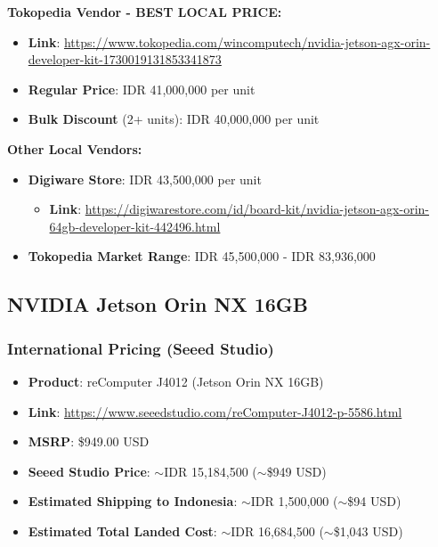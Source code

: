 \documentclass[12pt,a4paper]{article}
\begin{document}
\textbf{Tokopedia Vendor - BEST LOCAL PRICE:}
\begin{itemize}
    \item \textbf{Link}: \url{https://www.tokopedia.com/wincomputech/nvidia-jetson-agx-orin-developer-kit-1730019131853341873}
    \item \textbf{Regular Price}: IDR 41,000,000 per unit
    \item \textbf{Bulk Discount} (2+ units): IDR 40,000,000 per unit
\end{itemize}

\textbf{Other Local Vendors:}
\begin{itemize}
    \item \textbf{Digiware Store}: IDR 43,500,000 per unit
    \begin{itemize}
        \item \textbf{Link}: \url{https://digiwarestore.com/id/board-kit/nvidia-jetson-agx-orin-64gb-developer-kit-442496.html}
    \end{itemize}
    \item \textbf{Tokopedia Market Range}: IDR 45,500,000 - IDR 83,936,000
\end{itemize}

\subsection{NVIDIA Jetson Orin NX 16GB}

\subsubsection*{International Pricing (Seeed Studio)}
\begin{itemize}
    \item \textbf{Product}: reComputer J4012 (Jetson Orin NX 16GB)
    \item \textbf{Link}: \url{https://www.seeedstudio.com/reComputer-J4012-p-5586.html}
    \item \textbf{MSRP}: \$949.00 USD
    \item \textbf{Seeed Studio Price}: $\sim$IDR 15,184,500 ($\sim$\$949 USD)
    \item \textbf{Estimated Shipping to Indonesia}: $\sim$IDR 1,500,000 ($\sim$\$94 USD)
    \item \textbf{Estimated Total Landed Cost}: $\sim$IDR 16,684,500 ($\sim$\$1,043 USD)
\end{itemize}
\end{document}
